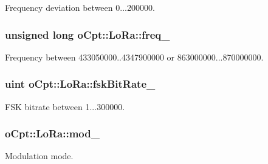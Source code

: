 Frequency deviation between 0...200000. 

\subsubsection[{\texorpdfstring{freq\+\_\+}{freq_}}]{\setlength{\rightskip}{0pt plus 5cm}unsigned long o\+Cpt\+::\+Lo\+Ra\+::freq\+\_\+\hspace{0.3cm}{\ttfamily [protected]}}\hypertarget{classo_cpt_1_1_lo_ra_ab57a9c27d2f5744eaf07bdee11a24aba}{}\label{classo_cpt_1_1_lo_ra_ab57a9c27d2f5744eaf07bdee11a24aba}


Frequency between 433050000..4347900000 or 863000000...870000000. 

\subsubsection[{\texorpdfstring{fsk\+Bit\+Rate\+\_\+}{fskBitRate_}}]{\setlength{\rightskip}{0pt plus 5cm}uint o\+Cpt\+::\+Lo\+Ra\+::fsk\+Bit\+Rate\+\_\+\hspace{0.3cm}{\ttfamily [protected]}}\hypertarget{classo_cpt_1_1_lo_ra_ae8fc701f0418461263bc0049e95ab01e}{}\label{classo_cpt_1_1_lo_ra_ae8fc701f0418461263bc0049e95ab01e}


F\+SK bitrate between 1...300000. 

\subsubsection[{\texorpdfstring{mod\+\_\+}{mod_}}]{ o\+Cpt\+::\+Lo\+Ra\+::mod\+\_\+\hspace{0.3cm}{\ttfamily [protected]}}\hypertarget{classo_cpt_1_1_lo_ra_a98e0dc05a9e45a08afa36beddfe27072}{}\label{classo_cpt_1_1_lo_ra_a98e0dc05a9e45a08afa36beddfe27072}


Modulation mode. 

